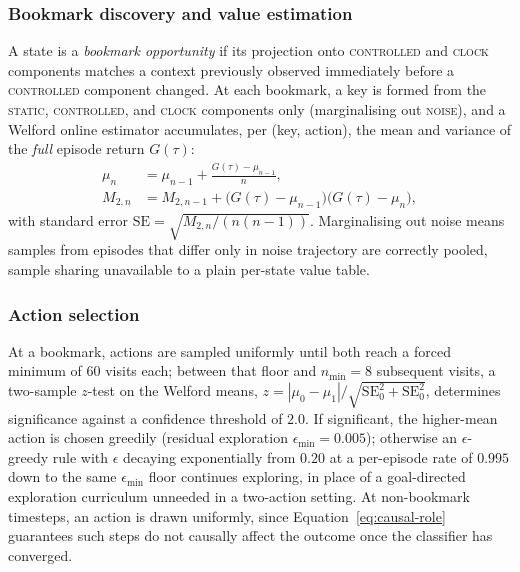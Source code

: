 \documentclass[conference]{IEEEtran}
\begin{document}
\subsubsection{Bookmark discovery and value estimation}
A state is a \emph{bookmark opportunity} if its projection onto \textsc{controlled} and \textsc{clock} components matches a context previously observed immediately before a \textsc{controlled} component changed. At each bookmark, a key is formed from the \textsc{static}, \textsc{controlled}, and \textsc{clock} components only (marginalising out \textsc{noise}), and a Welford online estimator \cite{b_welford1962method} accumulates, per (key, action), the mean and variance of the \emph{full} episode return $G(\tau)$:
\begin{equation}
  \begin{aligned}
    \mu_n &= \mu_{n-1} + \frac{G(\tau) - \mu_{n-1}}{n}, \\
    M_{2,n} &= M_{2,n-1} + \big(G(\tau)-\mu_{n-1}\big)\big(G(\tau)-\mu_n\big) ,
  \end{aligned}
  \label{eq:welford}
\end{equation}
with standard error $\mathrm{SE} = \sqrt{M_{2,n}/(n(n-1))}$. Marginalising out noise means samples from episodes that differ only in noise trajectory are correctly pooled, sample sharing unavailable to a plain per-state value table.

\subsubsection{Action selection}
At a bookmark, actions are sampled uniformly until both reach a forced minimum of 60 visits each; between that floor and $n_{\min}=8$ subsequent visits, a two-sample $z$-test on the Welford means, $z = |\mu_0 - \mu_1| / \sqrt{\mathrm{SE}_0^2 + \mathrm{SE}_0^2}$, determines significance against a confidence threshold of $2.0$. If significant, the higher-mean action is chosen greedily (residual exploration $\epsilon_{\min}=0.005$); otherwise an $\epsilon$-greedy rule with $\epsilon$ decaying exponentially from $0.20$ at a per-episode rate of $0.995$ down to the same $\epsilon_{\min}$ floor continues exploring, in place of a goal-directed exploration curriculum \cite{b_florensa2018goalgan,b_mendonca2021lexa} unneeded in a two-action setting. At non-bookmark timesteps, an action is drawn uniformly, since Equation~\eqref{eq:causal-role} guarantees such steps do not causally affect the outcome once the classifier has converged.
\end{document}
